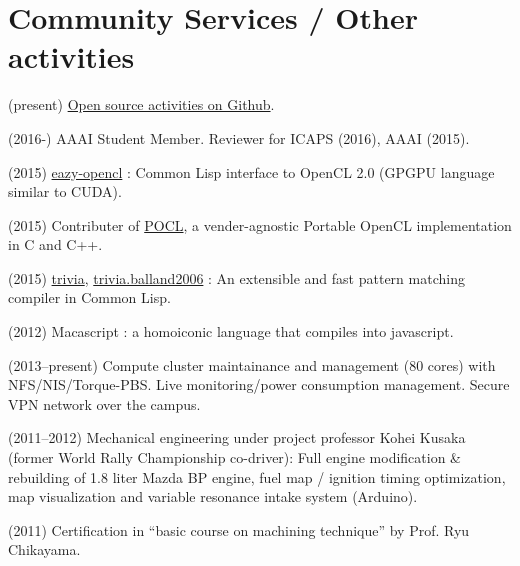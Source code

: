 \documentclass[letterpaper,11pt]{article}
\begin{document}
\section{Community Services / Other activities}

(present) \href{https://github.com/guicho271828}{Open source activities on Github}.

(2016-) AAAI Student Member. Reviewer for ICAPS (2016), AAAI (2015).

(2015) \href{https://github.com/guicho271828/eazy-opencl}{eazy-opencl}
: Common Lisp interface to OpenCL 2.0 (GPGPU language similar to CUDA).

(2015) Contributer of \href{https://github.com/pocl/pocl}{POCL},
a vender-agnostic Portable OpenCL implementation in C and C++.

(2015) \href{https://github.com/guicho271828/trivia}{trivia},
\href{https://github.com/guicho271828/trivia.balland2006}{trivia.balland2006}
: An extensible and fast pattern matching compiler in Common Lisp.

(2012) Macascript : a homoiconic language that compiles into javascript.

(2013--present)
 Compute cluster maintainance and management (80 cores) with NFS/NIS/Torque-PBS.
 Live monitoring/power consumption management.
 Secure VPN network over the campus.

(2011--2012) Mechanical engineering under project professor Kohei Kusaka (former World Rally
 Championship co-driver):
 Full engine modification \& rebuilding of 1.8 liter Mazda BP engine,
 fuel map / ignition timing optimization, map visualization and
 variable resonance intake system (Arduino).

(2011) Certification in ``basic course on machining technique'' by Prof. Ryu Chikayama.

\end{document}
